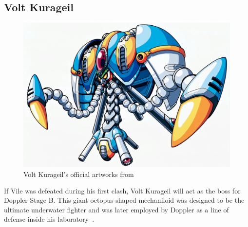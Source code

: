 \subsection{Volt Kurageil}\label{boss:Volt_kurageil}
\begin{figure}[htp]
	\centering
	\includegraphics[height=\portraitsize]{figures/X3/Doppler_stages/Volt_Kurageil.png}
	\caption{Volt Kurageil's official artworks from~\cite{book:MMX_Complete_art}}
\end{figure}
If Vile was defeated during his first clash, Volt Kurageil will act as the boss for Doppler Stage B. This giant octopus-shaped mechaniloid was designed to be the ultimate underwater fighter and was later employed by Doppler as a line of defense inside his laboratory~\cite{wayback:X2_resources}.

